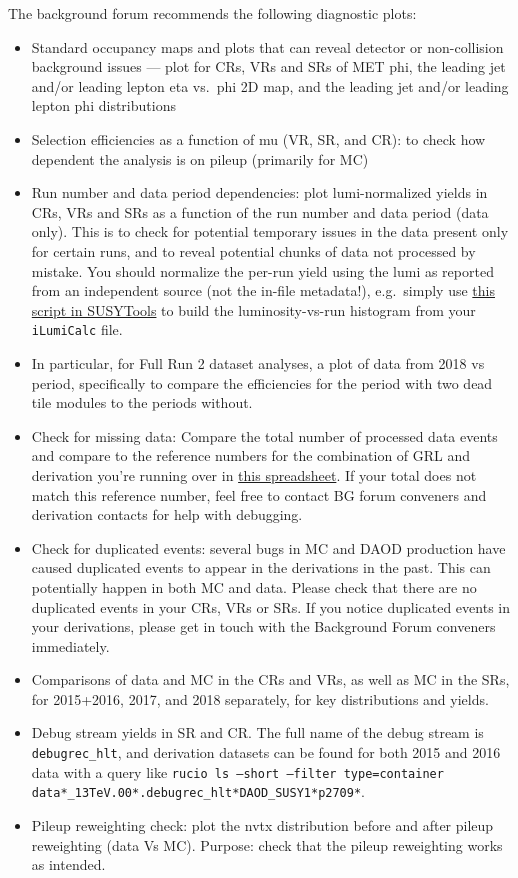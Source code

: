 The background forum recommends the following diagnostic plots:
\begin{itemize}
\item Standard occupancy maps and plots that can reveal detector or non-collision background issues --- plot for CRs, VRs and SRs of MET phi, the leading jet and/or leading lepton eta vs.\ phi 2D map, and the leading jet and/or leading lepton phi distributions
\item Selection efficiencies as a function of mu (VR, SR, and CR): to check how dependent the analysis is on pileup (primarily for MC)
\item Run number and data period dependencies: plot lumi-normalized yields in CRs, VRs and SRs as a function of the run number and data period (data only).
    This is to check for potential temporary issues in the data present only for certain runs, and to reveal potential chunks of data not processed by mistake.
    You should normalize the per-run yield using the lumi as reported from an independent source (not the in-file metadata!),
    e.g.\ simply use \href{https://svnweb.cern.ch/trac/atlasoff/browser/PhysicsAnalysis/SUSYPhys/SUSYTools/trunk/scripts/ilumi2histo.py}{this script in SUSYTools} to build the luminosity-vs-run histogram from your \texttt{iLumiCalc} file.
\item In particular, for Full Run 2 dataset analyses, a plot of data from 2018 vs period, specifically to compare the efficiencies for the period with two dead tile modules to the periods without.
\item Check for missing data: Compare the total number of processed data events and compare to the reference numbers for the combination of GRL and derivation you're running over in \href{https://docs.google.com/spreadsheets/d/1LMioo0nvALkKgoCKRW_ihQThHyVwcOQVRJe4aXiENUs/edit#gid=424865170}{this spreadsheet}. If your total does not match this reference number, feel free to contact BG forum conveners and derivation contacts for help with debugging.
\item Check for duplicated events: several bugs in MC and DAOD production have caused duplicated events to appear in the derivations in the past. This can potentially happen in both MC and data. Please check that there are no duplicated events in your CRs, VRs or SRs. If you notice duplicated events in your derivations, please get in touch with the Background Forum conveners immediately.
\item Comparisons of data and MC in the CRs and VRs, as well as MC in the SRs, for 2015+2016, 2017, and 2018 separately, for key distributions and yields.
\item Debug stream yields in SR and CR. The full name of the debug stream is \texttt{debugrec\_hlt}, and derivation datasets can be found for both 2015 and 2016 data with a query like \texttt{rucio ls --short --filter type=container data*\_13TeV.00*.debugrec\_hlt*DAOD\_SUSY1*p2709*}.
\item Pileup reweighting check: plot the nvtx distribution before and after pileup reweighting (data Vs MC). Purpose: check that the pileup reweighting works as intended.
\end{itemize}

